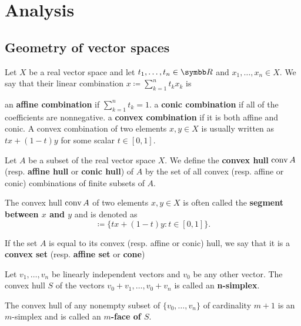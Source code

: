 \section{Analysis}\label{sec:analysis}
\subsection{Geometry of vector spaces}\label{subsec:geometry_of_vector_spaces}

\begin{definition}\label{def:real_linear_combinations}
  Let \( X \) be a real vector space and let \( t_1, \ldots, t_n \in \BB{R} \) and \( x_1, \ldots, x_n \in X \). We say that their linear combination \( x \coloneqq \sum_{k=1}^n t_k x_k \) is

  \begin{defenum}
     an \textbf{affine combination} if \( \sum_{k=1}^n t_k = 1 \).
     a \textbf{conic combination} if all of the coefficients are nonnegative.
     a \textbf{convex combination} if it is both affine and conic. A convex combination of two elements \( x, y \in X \) is usually written as \( tx + (1-t)y \) for some scalar \( t \in [0, 1] \).
  \end{defenum}
\end{definition}

\begin{definition}\label{def:linear_combination_hulls}
  Let \( A \) be a subset of the real vector space \( X \). We define the \textbf{convex hull} \( \operatorname{conv} A \) (resp. \textbf{affine hull} or \textbf{conic hull}) of \( A \) by the set of all convex (resp. affine or conic) combinations of finite subsets of \( A \).

  The convex hull \( \operatorname{conv} A \) of two elements \( x, y \in X \) is often called the \textbf{segment between \( x \) and \( y \)} and is denoted as
  \begin{equation*}
    [x, y] \coloneqq \{ tx + (1-t)y \colon t \in [0, 1] \}.
  \end{equation*}

  If the set \( A \) is equal to its convex (resp. affine or conic) hull, we say that it is a \textbf{convex set} (resp. \textbf{affine set} or \textbf{cone})
\end{definition}

\begin{definition}\label{def:simplex}
  Let \( v_1, \ldots, v_n \) be linearly independent vectors and \( v_0 \) be any other vector. The convex hull \( S \) of the vectors \( v_0 + v_1, \ldots, v_0 + v_n \) is called an \textbf{n-simplex}.

  The convex hull of any nonempty subset of \( \{ v_0, \ldots, v_n \} \) of cardinality \( m + 1 \) is an \( m \)-simplex and is called an \textbf{\( m \)-face of \( S \)}.
\end{definition}

